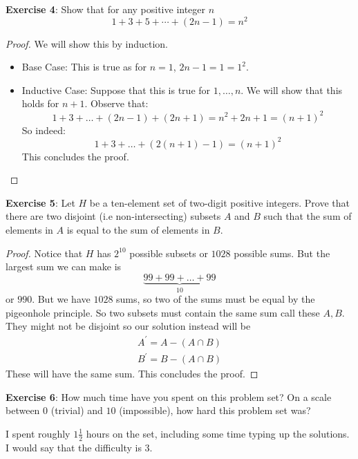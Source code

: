 \documentclass{article}
\begin{document}
\textbf{Exercise 4}: Show that for any positive integer $n$
    \begin{equation*}
        1 + 3 + 5 + \cdots + (2n - 1) = n^{2}
    \end{equation*}
    \begin{proof}
        We will show this by induction.
            \begin{itemize}
                \item Base Case: This is true as for $n = 1$, $2n - 1 = 1 = 1^{2}$.

                \item Inductive Case: Suppose that this is true for $1, \ldots, n$. We will show that this holds for $n + 1$. 
                    Observe that:
                        \begin{equation*}
                            1 + 3 + \ldots + (2n - 1) + (2n + 1) = n^{2} + 2n + 1 = (n + 1)^{2}
                        \end{equation*}
                    So indeed:
                        \begin{equation*}
                            1 + 3 + \ldots + (2(n + 1) - 1) = (n + 1)^{2}
                        \end{equation*} 
                    This concludes the proof.
            \end{itemize}
    \end{proof}

\textbf{Exercise 5}: Let $H$ be a ten-element set of two-digit positive integers. Prove that there are two disjoint (i.e non-intersecting) subsets $A$ and $B$ such that the sum of elements in $A$ is equal to the sum of elements in $B$.
    \begin{proof}
        Notice that $H$ has $2^{10}$ possible subsets or $1028$ possible sums. But the largest sum we can make is 
            \begin{equation*}
                \underbrace{99 + 99 + \ldots + 99}_{10}
            \end{equation*}
        or $990$. But we have $1028$ sums, so two of the sums must be equal by the pigeonhole principle. So two subsets must contain the same sum call these $A, B$. They might not be disjoint so our solution instead will be 
            \begin{align*}
                A^{\prime} = A - (A \cap B) \\
                B^{\prime} = B - (A \cap B)
            \end{align*}
        These will have the same sum. This concludes the proof.
    \end{proof}

\textbf{Exercise 6}: How much time have you spent on this problem set? On a scale between 0 (trivial) and $10$ (impossible), how hard this problem set was?

    \hspace{30pt} I spent roughly $1\frac{1}{2}$ hours on the set, including some time typing up the solutions. I would say that the difficulty is $3$.
\end{document}
